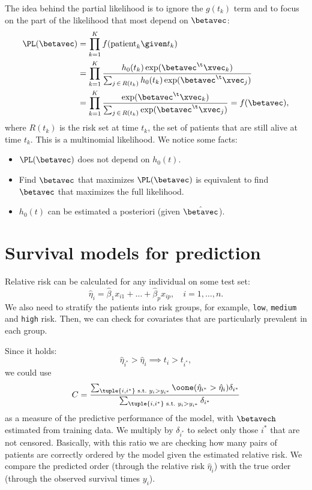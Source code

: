 The idea behind the partial likelihood is to ignore the $g(t_k)$ term and to focus on the part of the likelihood that most depend on $\betavec$:
\begin{equation}
    \begin{aligned}
        \PL(\betavec) & = \prod_{k = 1}^K f(\text{patient}_k \given t_k)                                                                \\
                      & = \prod_{k = 1}^K \frac{h_0(t_k)\exp(\betavec^\t\xvec_k)}{\sum_{j\,\in\,R(t_k)} h_0(t_k)\exp(\betavec^\t\xvec_j)} \\
                      & = \prod_{k = 1}^K \frac{\exp(\betavec^\t\xvec_k)}{\sum_{j\,\in\,R(t_k)} \exp(\betavec^\t\xvec_j)} = f(\betavec),
    \end{aligned}
\end{equation}
where $R(t_k)$ is the risk set at time $t_k$, \ie the set of patients that are still alive at time $t_k$. This is a multinomial likelihood. We notice some facts:
\begin{itemize}
    \item $\PL(\betavec)$ does not depend on $h_0(t)$.
    \item Find $\betavec$ that maximizes $\PL(\betavec)$ is equivalent to find $\betavec$ that maximizes the full likelihood.
    \item $h_0(t)$ can be estimated a posteriori (given $\hat{\betavec}$).
\end{itemize}

\section{Survival models for prediction}

Relative risk can be calculated for any individual on some test set:
\begin{equation}
    \hat{\eta}_i = \hat{\beta}_1 x_{i1} + \dots + \hat{\beta}_p x_{\mathit{ip}}, \quad i = 1, \dots, n.
\end{equation}
We also need to stratify the patients into risk groups, for example, \texttt{low}, \texttt{medium} and \texttt{high} risk. Then, we can check for covariates that are particularly prevalent in each group.

Since it holds:
\begin{equation}
    \hat{\eta}_{i^*} > \hat{\eta}_i \implies t_i > t_{i^*},
\end{equation}
we could use
\begin{equation}
    C = \frac{\sum_{\tuple{i, i^*} \text{ s.t.\@ } y_i > y_{i^*}} \oone(\hat{\eta}_{i^*} > \hat{\eta}_i)\delta_{i^*}}{\sum_{\tuple{i, i^*} \text{ s.t.\@ } y_i > y_{i^*}} \delta_{i^*}}
\end{equation}
as a measure of the predictive performance of the model, with $\betavech$ estimated from training data. We multiply by $\delta_{i^*}$ to select only those $i^*$ that are not censored. Basically, with this ratio we are checking how many pairs of patients are correctly ordered by the model given the estimated relative risk. We compare the predicted order (through the relative risk $\hat{\eta}_i$) with the true order (through the observed survival times $y_i$).

